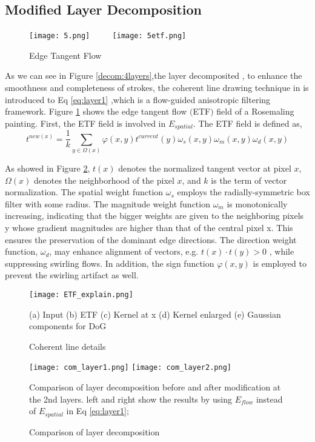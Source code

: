 \subsection{Modified Layer Decomposition}
\begin{figure}[H]
	\centering
	\texttt{[image: 5.png]}
	~~~~
	\texttt{[image: 5etf.png]}
	\caption{Edge Tangent Flow}
	\label{ETF}
\end{figure}

As we can see in Figure \ref{decom:4layers},the layer decomposited , to enhance the smoothness and completeness of strokes, the coherent line drawing technique in \cite{kang2007coherent} is introduced to Eq \ref{eq:layer1} ,which is a flow-guided anisotropic filtering framework. Figure \ref{ETF} shows the edge tangent flow $($ETF$)$ field of a Rosemaling painting. First, the ETF field is involved in $E_{spatial}$.\newline
The ETF field is defined as,
\begin{equation}
 t^{new(x)}=\frac{1}{k}\sum_{y\in\Omega(x)} \varphi(x,y)t^{current}(y)\omega_{s}(x,y)\omega_{m}(x,y)\omega_{d}(x,y)
 \label{eq:layer_etf} 
\end{equation}

As showed in Figure \ref{Coherent line details }, $t(x)$ denotes the normalized tangent vector at pixel $x$, $\Omega(x)$ denotes the neighborhood of the pixel $x$, and $k$ is the term of vector normalization. The spatial weight function $\omega_{s}$ employs the radially-symmetric box filter with some radius. The magnitude weight function $\omega_{m}$ is monotonically increasing, indicating that the bigger weights are given to the neighboring pixels y whose gradient magnitudes are higher than that of the central pixel x. This ensures the preservation of the dominant edge directions. The direction weight function, $\omega_{d}$, may enhance alignment of vectors, e.g. $t(x)\cdot t(y)>0$ , while suppressing swirling flows. In addition, the sign function $\varphi(x,y)$  is employed to prevent the swirling artifact as well.

\begin{figure}[H]
	\centering
	\texttt{[image: ETF\_explain.png]}
	\caption{Coherent line details }
	\label{Coherent line details }
	\medskip
	\small
	(a) Input (b) ETF (c) Kernel at x (d) Kernel enlarged (e) Gaussian components for DoG
\end{figure}

\begin{figure}[H]
	\centering
	\texttt{[image: com\_layer1.png]}
	\texttt{[image: com\_layer2.png]}
	\caption{Comparison of layer decomposition  }
	\label{com eflow}
	\medskip
	\small
	Comparison of layer decomposition before and after modification  at the 2nd layers. left and right show the results by using $E_{flow}$ instead of $E_{spatial}$ in Eq \ref{eq:layer1};
\end{figure}

